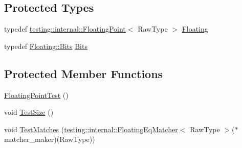\subsection*{Protected Types}
\begin{DoxyCompactItemize}
\item 
typedef \hyperlink{classtesting_1_1internal_1_1FloatingPoint}{testing\+::internal\+::\+Floating\+Point}$<$ Raw\+Type $>$ \hyperlink{classtesting_1_1gmock__matchers__test_1_1FloatingPointTest_ae1459f93e1b18426625daf4fa98e80c6}{Floating}
\item 
typedef \hyperlink{classtesting_1_1internal_1_1FloatingPoint_abf228bf6cd48f12c8b44c85b4971a731}{Floating\+::\+Bits} \hyperlink{classtesting_1_1gmock__matchers__test_1_1FloatingPointTest_addf899bd832ae51103198d201d2f2ea2}{Bits}
\end{DoxyCompactItemize}
\subsection*{Protected Member Functions}
\begin{DoxyCompactItemize}
\item 
\hyperlink{classtesting_1_1gmock__matchers__test_1_1FloatingPointTest_af2fb52db3abf63903d78541c4c3a17d3}{Floating\+Point\+Test} ()
\item 
void \hyperlink{classtesting_1_1gmock__matchers__test_1_1FloatingPointTest_ad6f8f0f5c939b7447a5717620b728018}{Test\+Size} ()
\item 
void \hyperlink{classtesting_1_1gmock__matchers__test_1_1FloatingPointTest_a69d14d66bbd82f6b8bbe985046b59538}{Test\+Matches} (\hyperlink{classtesting_1_1internal_1_1FloatingEqMatcher}{testing\+::internal\+::\+Floating\+Eq\+Matcher}$<$ Raw\+Type $>$($\ast$matcher\+\_\+maker)(Raw\+Type))
\end{DoxyCompactItemize}
